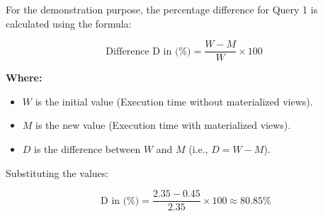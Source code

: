 For the demonstration purpose, the percentage difference for Query 1 is calculated using the formula:

\begin{equation}
\text{Difference D in  (\%)} = \frac{W - M}{W} \times 100
\end{equation}

\noindent \textbf{Where:}
\begin{itemize}
    \item \( W \) is the initial value (Execution time without materialized views).
    \item \( M \) is the new value (Execution time with materialized views).
    \item \( D \) is the difference between \( W \) and \( M \) (i.e., \( D = W - M \)).
\end{itemize}

Substituting the values:

\[
\text{ D in (\%)} = \frac{2.35 - 0.45}{2.35} \times 100 \approx 80.85\%
\]